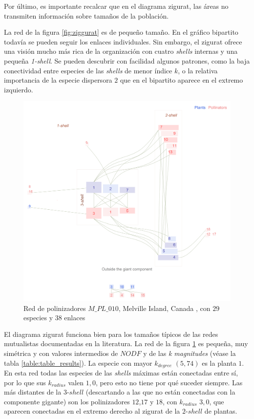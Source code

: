 Por último, es importante recalcar que en el diagrama zigurat, las áreas no transmiten información sobre tamaños de la población.

La red de la figura \ref{fig:ziggurat} es de pequeño tamaño. En el gráfico bipartito todavía se pueden seguir los enlaces individuales. Sin embargo, el zigurat ofrece una visión mucho más rica de la organización con cuatro \textit{shells} internas y una pequeña \textit{1-shell}. Se pueden descubrir con facilidad algunos patrones, como la baja conectividad entre especies de las \textit{shells} de menor índice $k$, o la relativa importancia de la especie dispersora $2$ que en el bipartito aparece en el extremo izquierdo.

\begin{figure}[ht!]
\centering
\includegraphics[scale=0.16]{Figures/VIS_zig_pl_024.png}
\caption {Red de polinizadores $M\_PL\_010$, Melville Island, Canada \cite{mosquin1967observations}, con $29$ especies y $38$ enlaces}
\label{fig:VIS_zig_pl_024}
\end{figure}

El diagrama zigurat funciona bien para los tamaños típicos de las redes mutualistas documentadas en la literatura. La red de la figura \ref{fig:VIS_zig_pl_024} es pequeña, muy simétrica y con valores intermedios de $NODF$ y de las \textit{k magnitudes} (véase la tabla \ref{table:table_results}). La especie con mayor $k_{degree}$ $(5,74)$ es la planta $1$. En esta red todas las especies de las \textit{shells} máximas están conectadas entre sí, por lo que sus $k_{radius}$ valen $1,0$, pero esto no tiene por qué suceder siempre. Las más distantes de la $3$-$shell$ (descartando a las que no están conectadas con la componente gigante) son los polinizadores $12$,$17$ y $18$, con  $k_{radius}$ $3,0$, que aparecen conectadas en el extremo derecho al zigurat de la $2$-$shell$ de plantas.


